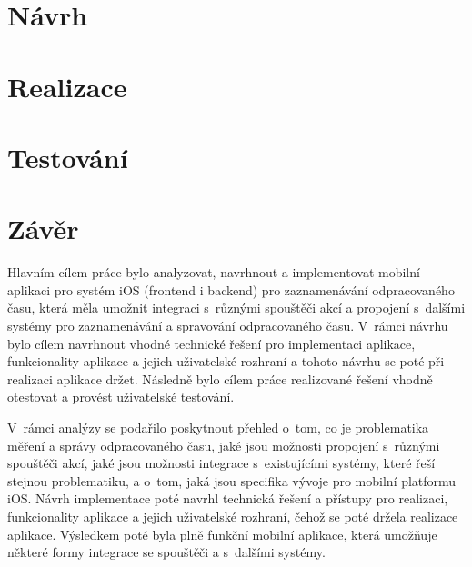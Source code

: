 

\chapter{Návrh}



\chapter{Realizace}



\chapter{Testování}



%

\chapter*{Závěr}

Hlavním cílem práce bylo analyzovat, navrhnout a implementovat mobilní aplikaci pro systém iOS (frontend i backend) pro zaznamenávání odpracovaného času, která měla umožnit integraci s~různými spouštěči akcí a propojení s~dalšími systémy pro zaznamenávání a spravování odpracovaného času. V~rámci návrhu bylo cílem navrhnout vhodné technické řešení pro implementaci aplikace, funkcionality aplikace a jejich uživatelské rozhraní a tohoto návrhu se poté při realizaci aplikace držet. Následně bylo cílem práce realizované řešení vhodně otestovat a provést uživatelské testování. 

V~rámci analýzy se podařilo poskytnout přehled o~tom, co je problematika měření a správy odpracovaného času, jaké jsou možnosti propojení s~různými spouštěči akcí, jaké jsou možnosti integrace s~existujícími systémy, které řeší stejnou problematiku, a o~tom, jaká jsou specifika vývoje pro mobilní platformu iOS. Návrh implementace poté navrhl technická řešení a přístupy pro realizaci, funkcionality aplikace a jejich uživatelské rozhraní, čehož se poté držela realizace aplikace. Výsledkem poté byla plně funkční mobilní aplikace, která umožňuje některé formy integrace se spouštěči a s~dalšími systémy.

